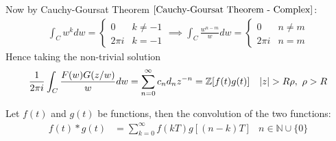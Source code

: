 \documentclass[12pt, english]{book}
\makeatletter
\renewenvironment{proof}[1][\proofname]{\par
	\pushQED{\qed}%
	\normalfont \topsep6\p@\@plus6\p@\relax
	\list{}{%
		\settowidth{\leftmargin}{\itshape\proofname:\hskip\labelsep}%
		\setlength{\labelwidth}{0pt}%
		\setlength{\itemindent}{-\leftmargin}%
	}%
	\item[\hskip\labelsep\itshape#1\@addpunct{:}]\ignorespaces
	}{ \popQED\endlist\@endpefalse}
\makeatother
\begin{document}
\begin{proof}
		Now by Cauchy-Goursat Theorem \(\cref{Cauchy-Goursat Theorem - Complex}\):
		\begin{align*}
			\int_{C} w^k dw =
			\begin{cases}
				0 & k\neq -1\\
				2\pi i & k = -1
			\end{cases}
			\implies
			\int_{C} \frac{w^{n-m}}{w} dw = 
			\begin{cases}
				0 & n \neq m\\
				2\pi i & n = m
			\end{cases}
		\end{align*}
		Hence taking the non-trivial solution
		\begin{align*}
			\frac{1}{2\pi i} \int_{C} \frac{F(w)G(z/w)}{w} dw
			&= \sum_{n=0}^{\infty} c_n d_n z^{-n} = \mathbb{Z}[f(t)g(t)]
				& \abs{z}> R\rho, \ \rho > R
		\end{align*}
	\end{proof}

	\begin{definition}[Convolution]
		\label{Convolution Definition - Complex}
		Let \(f(t)\) and \(g(t)\) be functions, then the convolution of the two functions:
		\begin{align*}
			f(t) \ast g(t) &= \sum_{k=0}^{\infty} f(kT) g[(n-k)T] & n \in \mathbb{N} \cup \{0\}
		\end{align*}
	\end{definition}
\end{document}
